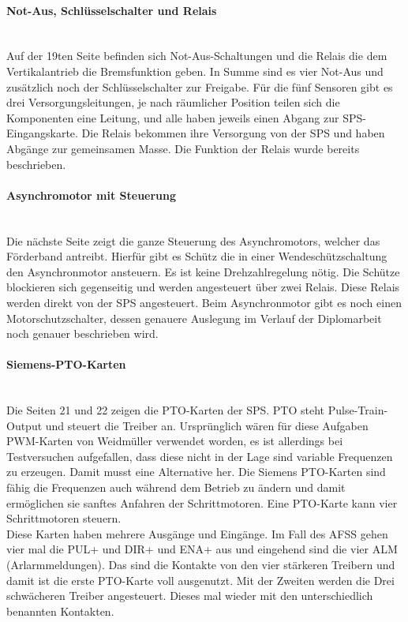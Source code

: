     \paragraph{Not-Aus, Schlüsselschalter und Relais}\mbox{}\\
    Auf der 19ten Seite befinden sich Not-Aus-Schaltungen und die Relais die dem Vertikalantrieb die Bremsfunktion geben. In Summe sind es vier Not-Aus und zusätzlich noch der Schlüsselschalter zur Freigabe. Für die fünf Sensoren gibt es drei Versorgungsleitungen, je nach räumlicher Position teilen sich die Komponenten eine Leitung, und alle haben jeweils einen Abgang zur SPS-Eingangskarte. Die Relais bekommen ihre Versorgung von der SPS und haben Abgänge zur gemeinsamen Masse. Die Funktion der Relais wurde bereits beschrieben.
    \paragraph{Asynchromotor mit Steuerung}\mbox{}\\
    Die nächste Seite zeigt die ganze Steuerung des Asynchromotors, welcher das Förderband antreibt. Hierfür gibt es Schütz die in einer Wendeschützschaltung den Asynchronmotor ansteuern. Es ist keine Drehzahlregelung nötig. Die Schütze blockieren sich gegenseitig und werden angesteuert über zwei Relais. Diese Relais werden direkt von der SPS angesteuert. Beim Asynchronmotor gibt es noch einen Motorschutzschalter, dessen genauere Auslegung im Verlauf der Diplomarbeit noch genauer beschrieben wird.
    \paragraph{Siemens-PTO-Karten}\mbox{}\\
    Die Seiten 21 und 22 zeigen die PTO-Karten der SPS. PTO steht Pulse-Train-Output und steuert die Treiber an. Ursprünglich wären für diese Aufgaben PWM-Karten von Weidmüller verwendet worden, es ist allerdings bei Testversuchen aufgefallen, dass diese nicht in der Lage sind variable Frequenzen zu erzeugen. Damit musst eine Alternative her. Die Siemens PTO-Karten sind fähig die Frequenzen auch während dem Betrieb zu ändern und damit ermöglichen sie sanftes Anfahren der Schrittmotoren. Eine PTO-Karte kann vier Schrittmotoren steuern.\\
    Diese Karten haben mehrere Ausgänge und Eingänge. Im Fall des AFSS gehen vier mal die PUL+ und DIR+ und ENA+ aus und eingehend sind die vier ALM (Arlarmmeldungen). Das sind die Kontakte von den vier stärkeren Treibern und damit ist die erste PTO-Karte voll ausgenutzt. Mit der Zweiten werden die Drei schwächeren Treiber angesteuert. Dieses mal wieder mit den unterschiedlich benannten Kontakten.
